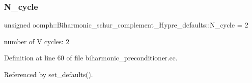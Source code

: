 \subsubsection{\texorpdfstring{N\+\_\+cycle}{N\_cycle}}
{\footnotesize\ttfamily unsigned oomph\+::\+Biharmonic\+\_\+schur\+\_\+complement\+\_\+\+Hypre\+\_\+defaults\+::\+N\+\_\+cycle = 2}



number of V cycles\+: 2 



Definition at line 60 of file biharmonic\+\_\+preconditioner.\+cc.



Referenced by set\+\_\+defaults().

